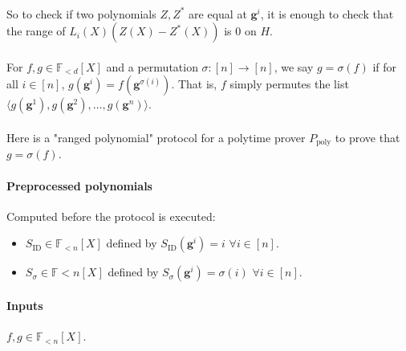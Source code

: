 \documentclass[11pt]{article}
\newcommand{\field}{\mathbb{F}}
\newcommand{\gen}{\mathbf{g}}
\begin{document}
\paragraph{} So to check if two polynomials $Z,Z^*$ are equal at $\gen^i$, it is enough to check that the range of $L_i(X)(Z(X) - Z^*(X))$ is 0 on $H$.

\paragraph{} For $f, g \in \mathbb{F}_{<d}[X]$ and a permutation $\sigma: [n] \rightarrow [n]$, we say $g = \sigma(f)$ if for all $i \in [n]$, $g(\gen^i) = f(\gen^{\sigma(i)})$. That is, $f$ simply permutes the list $\langle g(\gen^1), g(\gen^2), \ldots, g(\gen^n) \rangle$.

\paragraph{} Here is a "ranged polynomial" protocol for a polytime prover $P_{\text{poly}}$ to prove that $g = \sigma(f)$.

\paragraph{Preprocessed polynomials} Computed before the protocol is executed:
\begin{itemize}
    \item $S_{\text{ID}} \in \field_{<n}[X]$ defined by $S_{\text{ID}}(\gen^i) = i$ $\forall i \in [n]$.
    \item $S_\sigma \in \field{<n}[X]$ defined by $S_{\sigma}(\gen^i) = \sigma(i)$ $\forall i \in [n]$.
\end{itemize}

\paragraph{Inputs} $f, g \in \field_{<n}[X]$.
\end{document}
